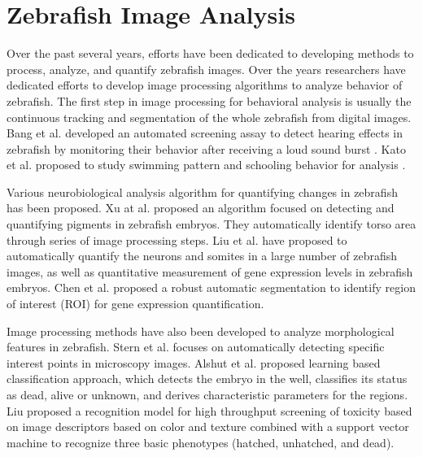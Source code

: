 \section{Zebrafish Image Analysis}

Over the past several years, efforts have been dedicated to developing methods to process, analyze, and quantify zebrafish images. Over the years researchers have dedicated efforts to develop image processing algorithms to analyze behavior of zebrafish. The first step in image processing for behavioral analysis is usually the continuous tracking and segmentation of the whole zebrafish from digital images. Bang et al. developed an automated screening assay to detect hearing effects in zebrafish by monitoring their behavior after receiving a loud sound burst \cite{Bang02}. Kato et al. proposed to study swimming pattern and schooling behavior for analysis \cite{Kato04}. 

\par
Various neurobiological analysis algorithm for quantifying changes in zebrafish has been proposed. Xu at al. \cite{Xu10} proposed an algorithm focused on detecting and quantifying pigments in zebrafish embryos. They automatically identify torso area through series of image processing steps. Liu et al. \cite{Liu06} have proposed to automatically quantify the neurons and somites in a large number of zebrafish images, as well as quantitative measurement of gene expression levels in zebrafish embryos. Chen et al. \cite{Chen11} proposed a robust automatic segmentation to identify region of interest (ROI) for gene expression quantification.

\par
Image processing methods have also been developed to analyze morphological features in zebrafish. Stern et al. \cite{Stern11} focuses on automatically detecting specific interest points in microscopy images. Alshut et al. \cite{alshut2010} proposed learning based classification approach, which detects the embryo in the well, classifies its status as dead, alive or unknown, and derives characteristic parameters for the regions. Liu \cite{Liu12} proposed a recognition model for high throughput screening of toxicity based on image descriptors based on color and texture combined with a support vector machine to recognize three basic phenotypes (hatched, unhatched, and dead).

